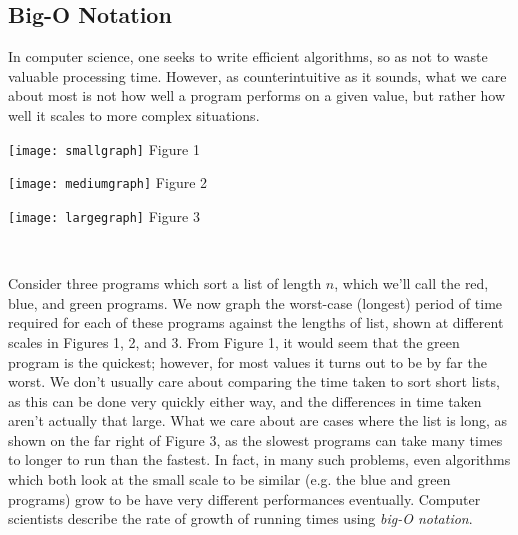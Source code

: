 \documentclass[12pt,a4paper]{report}
\newcounter{count}
\begin{document}
\begin{multicols}{2}
\begin{multicols}{2}
\subsection{Big-O Notation}

In computer science, one seeks to write efficient algorithms, so as not to waste valuable processing time. However, as counterintuitive as it sounds, what we care about most is not how well a program performs on a given value, but rather how well it scales to more complex situations.\\

\end{multicols}

\clearpage

\parbox{0.333333333\textwidth}{\centering
	\texttt{[image: smallgraph]}
	Figure 1}
\parbox{0.333333333\textwidth}{\centering
	\texttt{[image: mediumgraph]}
	Figure 2}
\parbox{0.333333333\textwidth}{\centering
	\texttt{[image: largegraph]}
	Figure 3}\\

\begin{multicols}{2}

Consider three programs which sort a list of length \(n\), which we'll call the red, blue, and green programs. We now graph the worst-case (longest) period of time required for each of these programs against the lengths of list, shown at different scales in Figures 1, 2, and 3. From Figure 1, it would seem that the green program is the quickest; however, for most values it turns out to be by far the worst. We don't usually care about comparing the time taken to sort short lists, as this can be done very quickly either way, and the differences in time taken aren't actually that large. What we care about are cases where the list is long, as shown on the far right of Figure 3, as the slowest programs can take many times to longer to run than the fastest. In fact, in many such problems, even algorithms which both look at the small scale to be similar (e.g. the blue and green programs) grow to be have very different performances eventually. Computer scientists describe the rate of growth of running times using \textit{big-O notation}.


\end{multicols}
\end{multicols}
\end{document}
